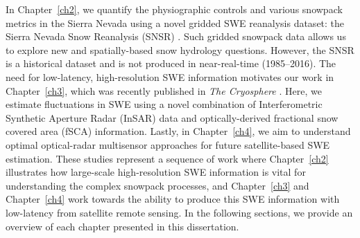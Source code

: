 In Chapter~\ref{ch2}, we quantify the physiographic controls and various snowpack metrics in the Sierra Nevada using a novel gridded SWE reanalysis dataset: the Sierra Nevada Snow Reanalysis (SNSR) \citep{margulisLandsatEraSierraNevada2016}. Such gridded snowpack data allows us to explore new and spatially-based snow hydrology questions. However, the SNSR is a historical dataset and is not produced in near-real-time (1985--2016). The need for low-latency, high-resolution SWE information motivates our work in Chapter~\ref{ch3}, which was recently published in \emph{The Cryosphere} \citep{tarriconeEstimatingSnowAccumulation2023a}. Here, we estimate fluctuations in SWE using a novel combination of Interferometric Synthetic Aperture Radar (InSAR) data and optically-derived fractional snow covered area (fSCA) information. Lastly, in Chapter~\ref{ch4}, we aim to understand optimal optical-radar multisensor approaches for future satellite-based SWE estimation. These studies represent a sequence of work where Chapter~\ref{ch2} illustrates how large-scale high-resolution SWE information is vital for understanding the complex snowpack processes, and Chapter~\ref{ch3} and Chapter~\ref{ch4} work towards the ability to produce this SWE information with low-latency from satellite remote sensing. In the following sections, we provide an overview of each chapter presented in this dissertation. 










